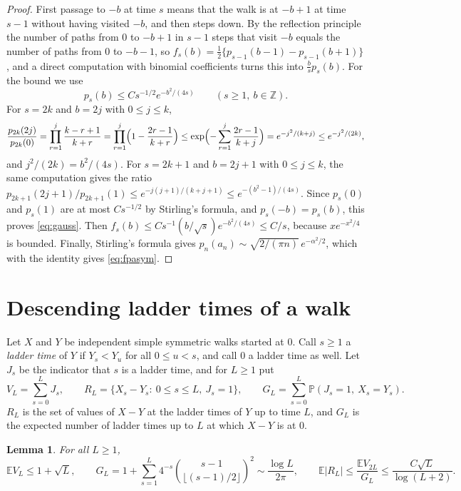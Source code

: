 \documentclass[11pt]{amsart}
\newtheorem{lemma}[theorem]{Lemma}
\theoremstyle{remark}
\numberwithin{equation}{section}
\newcommand{\PP}{\mathbb{P}}
\newcommand{\EE}{\mathbb{E}}
\newcommand{\Z}{\mathbb{Z}}
\begin{document}
\begin{proof}
First passage to $-b$ at time $s$ means that the walk is at $-b+1$ at time $s-1$ without having visited $-b$, and then steps down. By the reflection principle the number of paths from $0$ to $-b+1$ in $s-1$ steps that visit $-b$ equals the number of paths from $0$ to $-b-1$, so $f_s(b)=\frac12\{p_{s-1}(b-1)-p_{s-1}(b+1)\}$, and a direct computation with binomial coefficients turns this into $\frac bs p_s(b)$. For the bound we use
\begin{equation}\label{eq:gauss}
p_s(b)\le Cs^{-1/2}e^{-b^2/(4s)}\qquad(s\ge1,\ b\in\Z).
\end{equation}
For $s=2k$ and $b=2j$ with $0\le j\le k$,
\[
\frac{p_{2k}(2j)}{p_{2k}(0)}=\prod_{r=1}^{j}\frac{k-r+1}{k+r}=\prod_{r=1}^{j}\Bigl(1-\frac{2r-1}{k+r}\Bigr)\le\exp\Bigl(-\sum_{r=1}^j\frac{2r-1}{k+j}\Bigr)=e^{-j^2/(k+j)}\le e^{-j^2/(2k)},
\]
and $j^2/(2k)=b^2/(4s)$. For $s=2k+1$ and $b=2j+1$ with $0\le j\le k$, the same computation gives the ratio $p_{2k+1}(2j+1)/p_{2k+1}(1)\le e^{-j(j+1)/(k+j+1)}\le e^{-(b^2-1)/(4s)}$. Since $p_s(0)$ and $p_s(1)$ are at most $Cs^{-1/2}$ by Stirling's formula, and $p_s(-b)=p_s(b)$, this proves \eqref{eq:gauss}. Then $f_s(b)\le Cs^{-1}(b/\sqrt s)e^{-b^2/(4s)}\le C/s$, because $xe^{-x^2/4}$ is bounded. Finally, Stirling's formula gives $p_n(a_n)\sim\sqrt{2/(\pi n)}\,e^{-\alpha^2/2}$, which with the identity gives \eqref{eq:fpasym}.
\end{proof}

\section{Descending ladder times of a walk}\label{sec:range}

Let $X$ and $Y$ be independent simple symmetric walks started at $0$. Call $s\ge1$ a \emph{ladder time} of $Y$ if $Y_s<Y_u$ for all $0\le u<s$, and call $0$ a ladder time as well. Let $J_s$ be the indicator that $s$ is a ladder time, and for $L\ge1$ put
\[
V_L=\sum_{s=0}^LJ_s,\qquad R_L=\{X_s-Y_s:\ 0\le s\le L,\ J_s=1\},\qquad G_L=\sum_{s=0}^L\PP(J_s=1,\ X_s=Y_s).
\]
$R_L$ is the set of values of $X-Y$ at the ladder times of $Y$ up to time $L$, and $G_L$ is the expected number of ladder times up to $L$ at which $X-Y$ is at $0$.

\begin{lemma}\label{lem:range}
For all $L\ge1$,
\begin{equation}\label{eq:range}
\EE V_L\le1+\sqrt L,\qquad G_L=1+\sum_{s=1}^L4^{-s}\binom{s-1}{\lfloor(s-1)/2\rfloor}^{2}\sim\frac{\log L}{2\pi},\qquad \EE|R_L|\le\frac{\EE V_{2L}}{G_L}\le\frac{C\sqrt L}{\log(L+2)}.
\end{equation}
\end{lemma}
\end{document}
